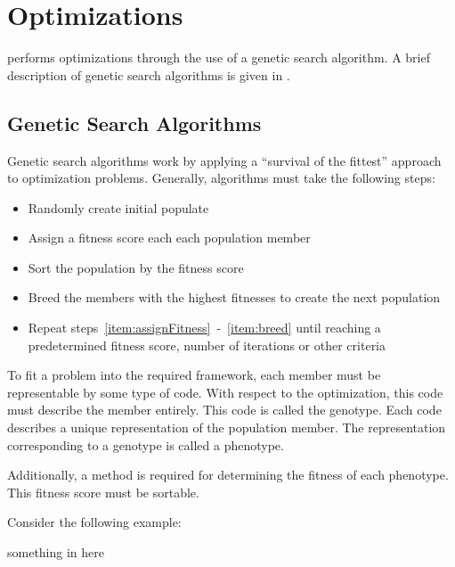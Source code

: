\chapter{Optimizations} \label{ch:optimizations}

\vvase{} performs optimizations through the use of a genetic search algorithm.  A brief description of genetic search algorithms is given in .


\section{Genetic Search Algorithms} \label{sec:geneticAlgorithms}

Genetic search algorithms work by applying a ``survival of the fittest'' approach to optimization problems.  Generally, algorithms must take the following steps:

\begin{itemize}
\item Randomly create initial populate
\item Assign a fitness score each each population member \label{item:assignFitness}
\item Sort the population by the fitness score
\item Breed the members with the highest fitnesses to create the next population \label{item:breed}
\item Repeat steps~\ref{item:assignFitness}~-~\ref{item:breed} until reaching a predetermined fitness score, number of iterations or other criteria
\end{itemize}

To fit a problem into the required framework, each member must be representable by some type of code. With respect to the optimization, this code must describe the member entirely.  This code is called the genotype.  Each code describes a unique representation of the population member.  The representation corresponding to a genotype is called a phenotype.

Additionally, a method is required for determining the fitness of each phenotype.  This fitness score must be sortable.

Consider the following example:

\begin{ex}%
something in here
\end{ex}

